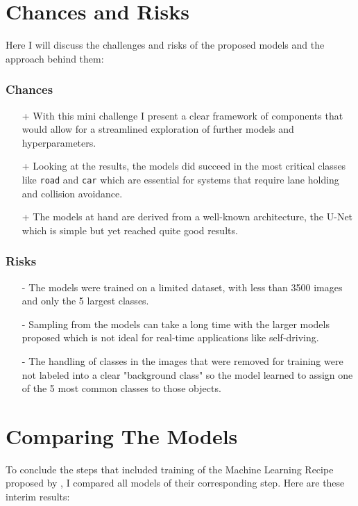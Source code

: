 \section{Chances and Risks}
Here I will discuss the challenges and risks of the proposed models and the approach behind them:

\noindent
\begin{minipage}{0.44\textwidth}
    \subsubsection*{Chances} 
    \begin{itemize} 
        \item[+] With this mini challenge I present a clear framework of components that would allow for a streamlined exploration of further models and hyperparameters.
        \item[+] Looking at the results, the models did succeed in the most critical classes like \texttt{road} and \texttt{car} which are essential for systems that require lane holding and collision avoidance.
        \item[+] The models at hand are derived from a well-known architecture, the U-Net which is simple but yet reached quite good results.
    \end{itemize} 
\end{minipage}
\hspace{0.05\textwidth}
\begin{minipage}{0.44\textwidth}
    \subsubsection*{Risks} 
    \begin{itemize} 
        \item[-] The models were trained on a limited dataset, with less than 3500 images and only the 5 largest classes.
        \item[-] Sampling from the models can take a long time with the larger models proposed which is not ideal for real-time applications like self-driving.
        \item[-] The handling of classes in the images that were removed for training were not labeled into a clear "background class" so the model learned to assign one of the 5 most common classes to those objects. 
    \end{itemize} 
\end{minipage}

\section{Comparing The Models}
To conclude the steps that included training of the Machine Learning Recipe proposed by \textcite{karpathyRecipeTrainingNeural2019}, I compared all models of their corresponding step. Here are these interim results:

